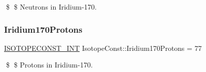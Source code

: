 \$ \$ Neutrons in Iridium-\/170. \mbox{\label{group___isotope_const-_iridium-_ir170_ga974402d0aff669883e8d34f3b44073e8}} 
\subsubsection{\texorpdfstring{Iridium170\+Protons}{Iridium170Protons}}
{\footnotesize\ttfamily \mbox{\hyperlink{group___isotope_const-_macros_ga5f18360b3e99483a35c32d789e62621c}{I\+S\+O\+T\+O\+P\+E\+C\+O\+N\+S\+T\+\_\+\+I\+NT}} Isotope\+Const\+::\+Iridium170\+Protons = 77}

\$ \$ Protons in Iridium-\/170. 